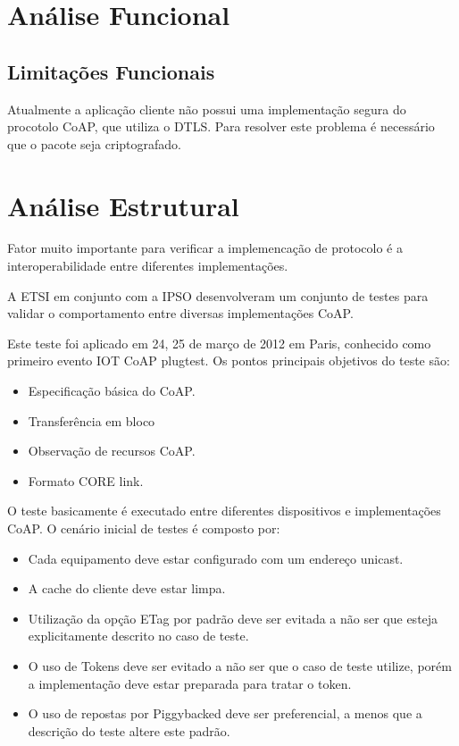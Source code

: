 \section{An\'alise Funcional}
\subsection{Limita\c{c}\~oes Funcionais}

Atualmente a aplica\c{c}\~ao cliente n\~ao possui uma implementa\c{c}\~ao segura do procotolo CoAP, que utiliza o DTLS.
Para resolver este problema \'e necess\'ario que o pacote seja criptografado.

\section{An\'alise Estrutural}

Fator muito importante para verificar a implemenca\c{c}\~ao de protocolo \'e a interoperabilidade entre diferentes implementa\c{c}\~oes.

A ETSI em conjunto com a IPSO desenvolveram um conjunto de testes para validar o comportamento entre diversas implementa\c{c}\~oes CoAP.

Este teste foi aplicado em 24, 25 de mar\c{c}o de 2012 em Paris, conhecido como primeiro evento IOT CoAP plugtest.  Os pontos principais objetivos do teste s\~ao:

\begin{itemize}
\item Especifica\c{c}\~ao b\'asica do CoAP.
\item Transfer\^encia em bloco
\item Observa\c{c}\~ao de recursos CoAP.
\item Formato CORE link.
\end{itemize}

O teste basicamente \'e executado entre diferentes dispositivos e implementa\c{c}\~oes CoAP. O cen\'ario inicial de testes \'e composto por:
    \begin{itemize}
        \item Cada equipamento deve estar configurado com um endere\c{c}o unicast.
        \item A cache do cliente deve estar limpa.
        \item Utiliza\c{c}\~ao da op\c{c}\~ao ETag por padr\~ao deve ser evitada a n\~ao ser que esteja explicitamente descrito no caso de teste. 
        \item O uso de Tokens deve ser evitado a n\~ao ser que o caso de teste utilize, por\'em a implementa\c{c}\~ao deve estar preparada para tratar o token.
        \item O uso de repostas por Piggybacked deve ser preferencial, a menos que a descri\c{c}\~ao do teste altere este padr\~ao.
    \end{itemize}

